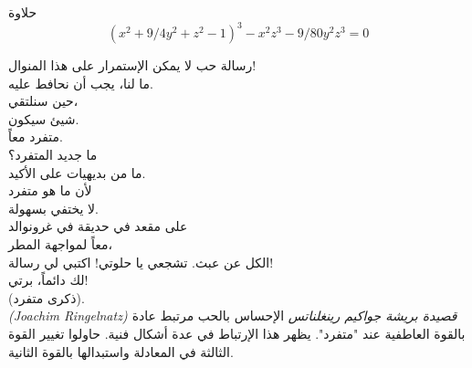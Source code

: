 \begin{surferPage}{حلاوة}
\[(x^2+ 9/4y^2	+ z^2- 1)^3- x^2z^3	- 9/80y^2z^3	= 0\]

\singlespacing
رسالة حب
\singlespacing
لا يمكن الإستمرار على هذا المنوال!\\
ما لنا، يجب أن نحافط عليه.\\
حين سنلتقي،\\
شيئ سيكون.\\
متفرد معاً. \\
ما جديد المتفرد؟\\
ما من بديهيات على الأكيد.\\
لأن ما هو متفرد\\
لا يختفي بسهولة.\\
على مقعد في حديقة في غرونوالد\\
معاً لمواجهة المطر،\\
الكل عن عبث. تشجعي يا حلوتي! اكتبي لي رسالة!\\
لك دائماً، برتي!\\
 (ذكرى متفرد).\\
\textit{\textenglish{(Joachim Ringelnatz)} قصيدة بريشة جواكيم رينغلناتس}
\singlespacing
الإحساس بالحب مرتبط عادة بالقوة العاطفية عند "متفرد". يظهر هذا الإرتباط في عدة أشكال فنية.
\singlespacing
حاولوا تغيير القوة الثالثة في المعادلة واستبدالها بالقوة الثانية.
\end{surferPage}
